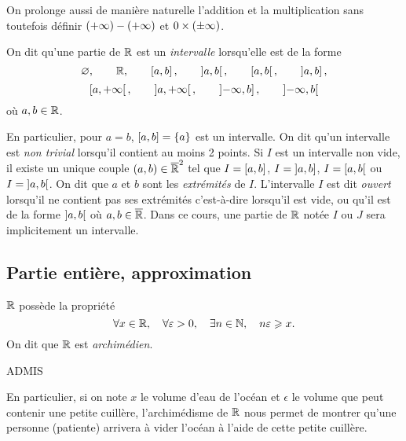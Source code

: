 \documentclass{magnolia}
\begin{document}
\begin{remarqueUnique}
\remarque On prolonge aussi de manière naturelle l'addition et la
  multiplication sans toutefois définir
  $\left(+\infty\right)-\left(+\infty\right)$ et $0\times\left(\pm \infty\right)$.
\end{remarqueUnique}

\begin{definition}
On dit qu'une partie de $\mathbb{R}$ est un \emph{intervalle} lorsqu'elle est de la forme
\[\varnothing, \qquad \mathbb{R}, \qquad \left[a,b\right], \qquad \left]a,b\right[, \qquad 
  \left[a,b\right[, \qquad \left]a,b\right],\]
\[\left[a,+\infty\right[, \qquad \left]a,+\infty\right[, \qquad \left]-\infty,b\right],
  \qquad \left]-\infty,b\right[\]
où $a,b\in\mathbb{R}$.
\end{definition}

\begin{remarques}
\remarque En particulier, pour $a=b$, $\left[a,b\right]=\left\{a\right\}$ est un intervalle.
  On dit qu'un intervalle est \emph{non trivial} lorsqu'il contient au moins 2 points.
\remarque Si $I$ est un intervalle non vide, il existe un unique couple $(a,b)\in\overline{\mathbb{R}}^2$ tel
  que $I=\left[a,b\right]$, $I=\left]a,b\right]$, $I=\left[a,b\right[$ ou
  $I=\left]a,b\right[$. On dit que $a$ et $b$ sont les
  \emph{extrémités} de $I$. L'intervalle $I$ est dit \emph{ouvert} lorsqu'il ne contient pas ses extrémités
  c'est-à-dire lorsqu'il est vide, ou qu'il est de la forme $\left]a,b\right[$ où $a,b\in\overline{\mathbb{R}}$.
\remarque Dans ce cours, une partie de $\mathbb{R}$ notée $I$ ou $J$ sera implicitement un intervalle.
\end{remarques}

\subsection{Partie entière, approximation}

\begin{proposition}
$\mathbb{R}$ possède la propriété
\[\forall x\in\mathbb{R} ,\quad \forall \varepsilon>0 ,\quad \exists n\in\mathbb{N} ,\quad n\varepsilon \geqslant x.\]
On dit que $\mathbb{R}$ est \emph{archimédien}.
\end{proposition}

\begin{preuve}
ADMIS

\end{preuve}

\begin{remarqueUnique}
\remarque En particulier, si on note $x$ le volume d'eau de l'océan et $\epsilon$ le volume
que peut contenir une petite cuillère, l'archimédisme de $\mathbb{R}$ nous permet de montrer qu'une
personne (patiente) arrivera à vider l'océan à l'aide de cette petite cuillère.
\end{remarqueUnique}
\end{document}
